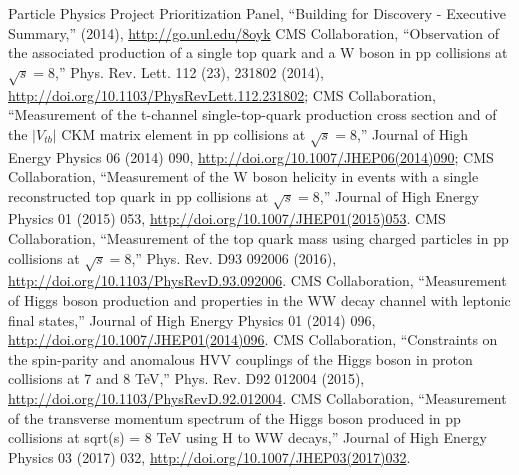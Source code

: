 \begin{thebibliography}{99}





%
%

Particle Physics Project Prioritization Panel, ``Building for Discovery - Executive Summary,'' (2014), \url{http://go.unl.edu/8oyk}
%
%
CMS Collaboration, ``Observation of the associated production of a single top quark and a W boson in pp collisions at $\sqrt{s}=$8\TeV,'' Phys. Rev. Lett. 112 (23), 231802 (2014), \url{http://doi.org/10.1103/PhysRevLett.112.231802};
%
CMS Collaboration, ``Measurement of the t-channel single-top-quark production cross section and of the $|V_{tb}|$ CKM matrix element in pp collisions at $\sqrt{s} = 8$\TeV,'' Journal of High Energy Physics 06 (2014) 090, \url{http://doi.org/10.1007/JHEP06(2014)090};
%
CMS Collaboration, ``Measurement of the W boson helicity in events with a
single reconstructed top quark in pp collisions at $\sqrt{s}=$8\TeV,''
Journal of High Energy Physics 01 (2015) 053,
\url{http://doi.org/10.1007/JHEP01(2015)053}.
%
 CMS Collaboration, ``Measurement of the top quark mass using charged
 particles in pp collisions at $\sqrt{s} = 8$\TeV,'' Phys. Rev.  D93 092006
 (2016), \url{http://doi.org/10.1103/PhysRevD.93.092006}. 
%
%
    CMS Collaboration, ``Measurement of Higgs boson production and properties in the WW decay channel with leptonic final states,''
    Journal of High Energy Physics 01 (2014) 096, \url{http://doi.org/10.1007/JHEP01(2014)096}.
%
  CMS Collaboration, ``Constraints on the spin-parity and anomalous HVV couplings of the Higgs boson in proton collisions at 7 and 8 TeV,''
  Phys. Rev. D92 012004 (2015), \url{http://doi.org/10.1103/PhysRevD.92.012004}.
%
    CMS Collaboration, ``Measurement of the transverse momentum spectrum of the Higgs boson produced in pp collisions at sqrt(s) = 8 TeV using H to WW decays,'' Journal of High Energy Physics 03 (2017) 032, \url{http://doi.org/10.1007/JHEP03(2017)032}.

\end{thebibliography}
